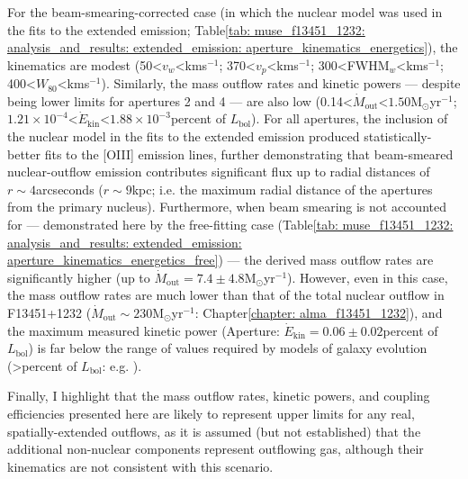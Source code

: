 For the beam-smearing-corrected case (in which the nuclear model was used in the fits to the extended emission; Table\;\ref{tab: muse_f13451_1232: analysis_and_results: extended_emission: aperture_kinematics_energetics}), the kinematics are modest (50\;\textless\;$v_w$\;\textless{}\;km\;s$^{-1}$; 370\;\textless\;$v_p$\;\textless{}\;km\;s$^{-1}$; 300\;\textless\;FWHM$_w$\;\textless{}\;km\;s$^{-1}$; 400\;\textless\;$W_\mathrm{80}$\;\textless{}\;km\;s$^{-1}$). Similarly, the mass outflow rates and kinetic powers --- despite being lower limits for apertures 2 and 4 --- are also low (0.14\;\textless\;$\dot{M}_\mathrm{out}$\;\textless\;$1.50$\;M$_\odot$\;yr$^{-1}$; $1.21\times10^{-4}$\;\textless\;$\dot{E}_\mathrm{kin}$\;\textless\;$1.88\times10^{-3}$\;per\;cent of $L_\mathrm{bol}$). For all apertures, the inclusion of the nuclear model in the fits to the extended emission produced statistically-better fits to the [OIII] emission lines, further demonstrating that beam-smeared nuclear-outflow emission contributes significant flux up to radial distances of $r\sim4$\;arcseconds ($r\sim9$\;kpc; i.e. the maximum radial distance of the apertures from the primary nucleus). Furthermore, when beam smearing is not accounted for --- demonstrated here by the free-fitting case (Table\;\ref{tab: muse_f13451_1232: analysis_and_results: extended_emission: aperture_kinematics_energetics_free}) --- the derived mass outflow rates are significantly higher (up to $\dot{M}_\mathrm{out}=7.4\pm4.8$\;M$_\odot$\;yr$^{-1}$). However, even in this case, the mass outflow rates are much lower than that of the total nuclear outflow in F13451+1232 ($\dot{M}_\mathrm{out}\sim230$\;M$_\odot$\;yr$^{-1}$: Chapter\;\ref{chapter: alma_f13451_1232}), and the maximum measured kinetic power (Aperture: $\dot{E}_\mathrm{kin}=0.06\pm0.02$\;per\;cent of $L_\mathrm{bol}$) is far below the range of values required by models of galaxy evolution (\textgreater{}\;per\;cent of $L_\mathrm{bol}$: e.g. \citealt{Springel2005, Hopkins2010, Schaye2015, Dubois2016}).

Finally, I highlight that the mass outflow rates, kinetic powers, and coupling efficiencies presented here are likely to represent upper limits for any real, spatially-extended outflows, as it is assumed (but not established) that the additional non-nuclear components represent outflowing gas, although their kinematics are not consistent with this scenario.

\clearpage

